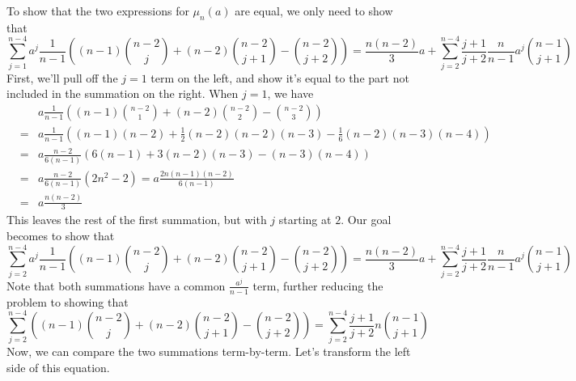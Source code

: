 \documentclass{article}
\begin{document}
To show that the two expressions for $\mu_n(a)$ are equal, we only need to show that 
\[ \sum_{j=1}^{n-4} a^j \frac{1}{n-1}\left( (n-1)\binom{n-2}{j} + (n-2)\binom{n-2}{j+1} - \binom{n-2}{j+2} \right) =
\frac{n(n-2)}{3}a + \sum_{j=2}^{n-4}\frac{j+1}{j+2}\frac{n}{n-1}a^j \binom{n-1}{j+1} 
\]
First, we'll pull off the $j = 1$ term on the left, and show it's equal to the part not included in the summation on the right.
When $j=1$, we have
\begin{eqnarray*}
& & a\frac{1}{n-1}\left( (n-1)\binom{n-2}{1} + (n-2)\binom{n-2}{2} - \binom{n-2}{3} \right) \\
&=&  a\frac{1}{n-1}\left( (n-1)(n-2) + \frac{1}{2}(n-2)(n-2)(n-3) - \frac{1}{6}(n-2)(n-3)(n-4) \right) \\
&=&  a\frac{n-2}{6(n-1)}\left(6(n-1) + 3(n-2)(n-3) - (n-3)(n-4) \right) \\
&=&  a\frac{n-2}{6(n-1)}(2n^2 - 2) =  a\frac{2n(n-1)(n-2)}{6(n-1)} \\
&=&  a\frac{n(n-2)}{3}
\end{eqnarray*}
This leaves the rest of the first summation, but with $j$ starting at $2$. Our goal becomes to show that
\[
\sum_{j=2}^{n-4} a^j \frac{1}{n-1}\left( (n-1)\binom{n-2}{j} + (n-2)\binom{n-2}{j+1} - \binom{n-2}{j+2} \right) 
 = \frac{n(n-2)}{3}a + \sum_{j=2}^{n-4}\frac{j+1}{j+2}\frac{n}{n-1}a^j \binom{n-1}{j+1} 
\]
Note that both summations have a common $\frac{a^j}{n-1}$ term, further reducing the problem to showing that
\[
\sum_{j=2}^{n-4} \left( (n-1)\binom{n-2}{j} + (n-2)\binom{n-2}{j+1} - \binom{n-2}{j+2} \right) 
 = \sum_{j=2}^{n-4}\frac{j+1}{j+2}n \binom{n-1}{j+1} 
\]
Now, we can compare the two summations term-by-term. Let's transform the left side of this equation.
\end{document}
